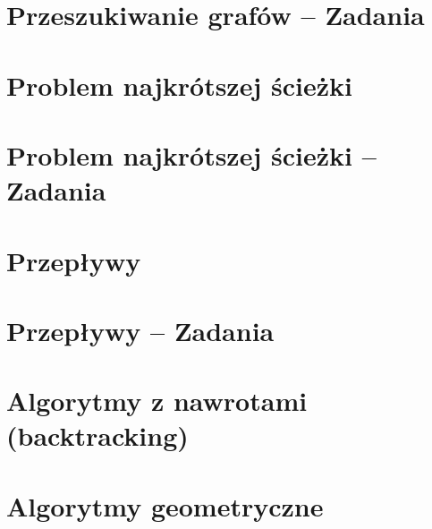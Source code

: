 \section{Przeszukiwanie grafów -- Zadania}

\section{Problem najkrótszej ścieżki}

\section{Problem najkrótszej ścieżki -- Zadania}

\section{Przepływy}

\section{Przepływy -- Zadania}

\section{Algorytmy z nawrotami (backtracking)}
\section{Algorytmy geometryczne}

